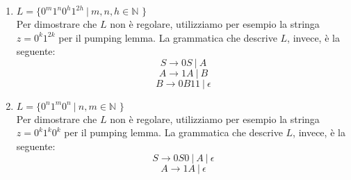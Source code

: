 \documentclass[a4paper,oneside,titlepage]{book}
\begin{document}
\begin{enumerate}[label=\fbox{\arabic*}]
\item $L = \text{\{ } 0^m 1^n 0^h 1^{2h} \ | \  m,n,h \in \mathbb{N} \text{ \}}$
\\ Per dimostrare che $L$ non è regolare, utilizziamo per esempio la stringa $z = 0^k 1^{2k}$ per il pumping lemma. La grammatica che descrive $L$, invece, è la seguente:
\[ S \longrightarrow 0S \ | \ A \]
\[ A \longrightarrow 1A \ | \ B \]
\[ B \longrightarrow 0B11 \ | \ \epsilon \]

\item $L = \text{\{ } 0^n 1^m 0^n \ | \  n,m \in \mathbb{N} \text{ \}}$
\\ Per dimostrare che $L$ non è regolare, utilizziamo per esempio la stringa $z = 0^k 1^k 0^k$ per il pumping lemma. La grammatica che descrive $L$, invece, è la seguente:
\[ S \longrightarrow 0S0 \ | \ A \ | \ \epsilon \]
\[ A \longrightarrow 1A \ | \ \epsilon \]
\end{enumerate}
\end{document}

